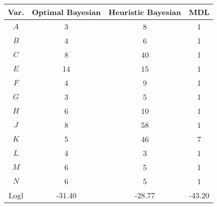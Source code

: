 \scriptsize
\begin{tabular}{cccc}
\toprule
Var.   & Optimal Bayesian & Heuristic Bayesian  & MDL          \\
\midrule
$A$    & 3        & 8                           & 1      \\
$B$    & 4        & 6                           & 1      \\
$C$    & 8        & 40                          & 1      \\
$E$    & 14       & 15                          & 1      \\
$F$    & 4        & 9                           & 1      \\
$G$    & 3        & 5                           & 1      \\
$H$    & 6        & 10                          & 1      \\
$J$    & 8        & 58                          & 1      \\
$K$    & 5        & 46                          & 7      \\
$L$    & 4        & 3                           & 1      \\
$M$    & 6        & 5                           & 1      \\
$N$    & 6        & 5                           & 1      \\
\addlinespace[0.5em]
Logl   & -31.40   & -28.77                      & -43.20 \\
\bottomrule
\end{tabular}
